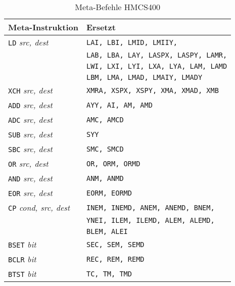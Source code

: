 \documentclass[12pt,a4paper,twoside]{report}
\newcommand{\tty}[1]{{\tt #1}}
\begin{document}
\begin{table*}
\begin{center}\begin{tabular}{|l|l|}
\hline
Meta-Instruktion          & Ersetzt \\
\hline
\tty{LD} {\em src, dest}        & \tty{LAI, LBI, LMID, LMIIY,} \\
                                & \tty{LAB, LBA, LAY, LASPX, LASPY, LAMR,} \\
                                & \tty{LWI, LXI, LYI, LXA, LYA, LAM, LAMD} \\
                                & \tty{LBM, LMA, LMAD, LMAIY, LMADY} \\
\tty{XCH} {\em src, dest}       & \tty{XMRA, XSPX, XSPY, XMA, XMAD, XMB} \\
\tty{ADD} {\em src, dest}       & \tty{AYY, AI, AM, AMD} \\
\tty{ADC} {\em src, dest}       & \tty{AMC, AMCD} \\
\tty{SUB} {\em src, dest}       & \tty{SYY} \\
\tty{SBC} {\em src, dest}       & \tty{SMC, SMCD} \\
\tty{OR}  {\em src, dest}       & \tty{OR, ORM, ORMD} \\
\tty{AND} {\em src, dest}       & \tty{ANM, ANMD} \\
\tty{EOR} {\em src, dest}       & \tty{EORM, EORMD} \\
\tty{CP}  {\em cond, src, dest} & \tty{INEM, INEMD, ANEM, ANEMD, BNEM,} \\
                                & \tty{YNEI, ILEM, ILEMD, ALEM, ALEMD,} \\
                                & \tty{BLEM, ALEI} \\
\tty{BSET} {\em bit}            & \tty{SEC, SEM, SEMD} \\
\tty{BCLR} {\em bit}            & \tty{REC, REM, REMD} \\
\tty{BTST} {\em bit}            & \tty{TC, TM, TMD} \\
\hline
\end{tabular}\end{center}
\caption{Meta-Befehle HMCS400}
\label{TabHMCS400Meta}
\end{table*}
\end{document}
